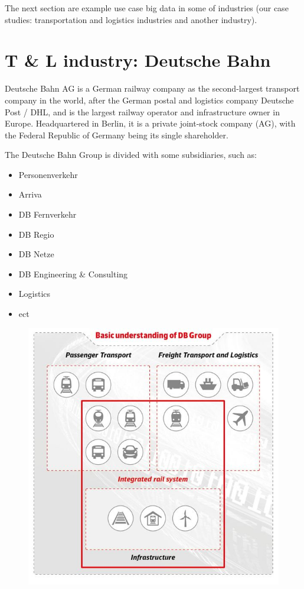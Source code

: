 \documentclass[]{book}
\providecommand{\tightlist}{%
  \setlength{\itemsep}{0pt}\setlength{\parskip}{0pt}}
\begin{document}
The next section are example use case big data in some of industries
(our case studies: transportation and logistics industries and another
industry).

\section{T \& L industry: Deutsche
Bahn}\label{t-l-industry-deutsche-bahn}

Deutsche Bahn AG is a German railway company as the second-largest
transport company in the world, after the German postal and logistics
company Deutsche Post / DHL, and is the largest railway operator and
infrastructure owner in Europe. Headquartered in Berlin, it is a private
joint-stock company (AG), with the Federal Republic of Germany being its
single shareholder.

The Deutsche Bahn Group is divided with some subsidiaries, such as:

\begin{itemize}
\tightlist
\item
  Personenverkehr
\item
  Arriva
\item
  DB Fernverkehr
\item
  DB Regio
\item
  DB Netze
\item
  DB Engineering \& Consulting
\item
  Logistics
\item
  ect
\end{itemize}

\begin{figure}
\centering
\includegraphics{db.jpg}
\caption{}
\end{figure}
\end{document}
